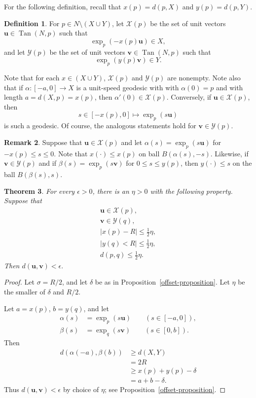 \documentclass{amsart}
\newcommand{\eps}{\epsilon}
\newcommand{\Tan}{\operatorname{Tan}}
\newcommand{\Xx}{\mathcal{X}}
\newcommand{\Yy}{\mathcal{Y}}
\newcommand{\vv}{\mathbf v}
\newcommand{\uu}{\mathbf{u}}
\newtheorem{theorem}    {Theorem}   %
\theoremstyle{definition}
\newtheorem{definition}  [theorem] {Definition}
\theoremstyle{definition}
\newtheorem{remark}   [theorem]       {Remark}
\begin{document}
For the following definition, recall that $x(p)=d(p,X)$ and $y(p)=d(p,Y)$.

\begin{definition}
For $p\in N\setminus(X\cup Y)$, let $\Xx(p)$ be the set of unit vectors $\uu\in \Tan(N,p)$
such that 
\[
   \exp_p( - x(p) \uu) \in X,
\]
and let $\Yy(p)$ be the set of unit vectors $\vv\in \Tan(N,p)$ such that 
\[
  \exp_p(y(p)\vv) \in Y.
\]
\end{definition}

Note that for each $x\in (X\cup Y)$, $\Xx(p)$ and $\Yy(p)$ are nonempty.
Note also that if $\alpha:[-a,0]\to X$  is a unit-speed geodesic
with with $\alpha(0)=p$ and with length $a=d(X,p)=x(p)$,
 then $\alpha'(0)\in \Xx(p)$.  Conversely, if $\uu\in \Xx(p)$,
then 
\[
   s \in [-x(p),0] \mapsto \exp_p(s\uu)
\]
is such a geodesic.  Of course, the analogous statements hold for $\vv\in \Yy(p)$.


\begin{remark}\label{exterior-sphere-remark}
Suppose that $\uu\in \Xx(p)$ and let $\alpha(s)=\exp_p(s\uu)$ for $-x(p)\le s \le 0$.
Note that $x(\cdot)\le x(p)$ on ball $B(\alpha(s),-s)$.
  Likewise, if $\vv\in \Yy(p)$ and if $\beta(s)=\exp_p(s\vv)$ for $0\le s\le y(p)$, then
  $y(\cdot)\le s$ on the ball $B(\beta(s),s)$.
\end{remark}



\begin{theorem}\label{u-v-theorem}
For every $\eps>0$, there is an $\eta>0$ with the following property.
Suppose that
\begin{gather*}
\uu\in \Xx(p), \\
\vv\in \Yy(q), \\
|x(p) - R| \le \frac12\eta, \\
|y(q) < R| \le  \frac12\eta, \\
d(p,q) \le \frac12\eta.
\end{gather*}
Then 
$
 d(\uu,\vv) < \eps.
$
\end{theorem}

\begin{proof}
Let $\sigma= R/2$, and let $\delta$ be as in Proposition~\ref{offset-proposition}.
Let $\eta$ be the smaller of $\delta$ and $R/2$.

Let $a=x(p)$, $b=y(q)$, and let
\begin{align*}
\alpha(s) &= \exp_p(s\uu)    \qquad (s\in [-a,0]), \\
\beta(s) &= \exp_q(s\vv)  \qquad (s\in [0,b]).
\end{align*}
Then
\begin{align*}
d(\alpha(-a),\beta(b))
&\ge
d(X,Y) \\
&= 
2R \\
&\ge
x(p) + y(p) -\delta \\
&=
a + b -\delta.
\end{align*}
Thus $d(\uu,\vv)<\eps$ by choice of $\eta$; see Proposition~\ref{offset-proposition}.
\end{proof}
\end{document}
